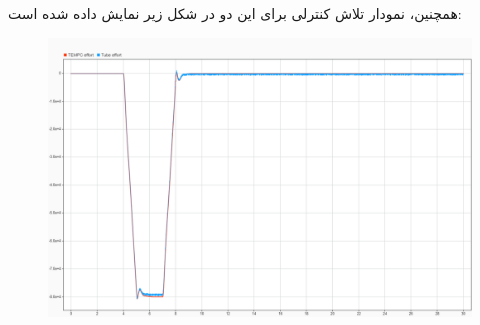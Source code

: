 همچنین، نمودار تلاش کنترلی برای این دو در شکل زیر نمایش داده شده است:
\begin{figure}[H]
	\centering
	\includegraphics[width=0.7\linewidth]{../img/42}
	\caption{}
	\label{fig:42}
\end{figure}

